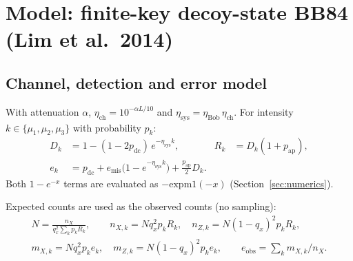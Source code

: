 \documentclass[11pt,a4paper]{article}
\begin{document}
\section{Model: finite-key decoy-state BB84 (Lim et al.\ 2014)}\label{sec:model}
\subsection{Channel, detection and error model}
With attenuation $\alpha$, $\eta_{\mathrm{ch}}=10^{-\alpha L/10}$ and $\eta_{\mathrm{sys}}=\eta_{\mathrm{Bob}}\,\eta_{\mathrm{ch}}$.
For intensity $k\in\{\mu_1,\mu_2,\mu_3\}$ with probability $p_k$:
\begin{align}
  D_k &= 1-(1-2p_{\mathrm{dc}})\,e^{-\eta_{\mathrm{sys}}k}, & R_k &= D_k(1+p_{\mathrm{ap}}),\\
  e_k &= p_{\mathrm{dc}} + e_{\mathrm{mis}}\bigl(1-e^{-\eta_{\mathrm{sys}}k}\bigr) + \tfrac{p_{\mathrm{ap}}}{2}D_k .
\end{align}
Both $1-e^{-x}$ terms are evaluated as $-\mathrm{expm1}(-x)$ (Section~\ref{sec:numerics}).

Expected counts are used as the observed counts (no sampling):
\begin{gather}
  N = \frac{n_X}{q_x^2\sum_k p_k R_k},\qquad
  n_{X,k}=Nq_x^2p_kR_k,\quad n_{Z,k}=N(1-q_x)^2p_kR_k,\\
  m_{X,k}=Nq_x^2p_ke_k,\quad m_{Z,k}=N(1-q_x)^2p_ke_k,\qquad
  e_{\mathrm{obs}}=\textstyle\sum_k m_{X,k}/n_X .
\end{gather}
\end{document}

